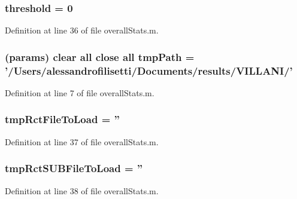 \hypertarget{a00026_a9ec673b91cb4ce5ba9842d584db1eea2}{
\subsubsection[{threshold}]{ threshold = 0}}\label{a00026_a9ec673b91cb4ce5ba9842d584db1eea2}


Definition at line 36 of file overall\-Stats.\-m.

\hypertarget{a00026_a1e5a4863ab2b87f923e1d19e2da1f5ac}{
\subsubsection[{tmp\-Path}]{(params) clear all close all tmp\-Path = '/Users/alessandrofilisetti/Documents/results/V\-I\-L\-L\-A\-N\-I/'}}\label{a00026_a1e5a4863ab2b87f923e1d19e2da1f5ac}


Definition at line 7 of file overall\-Stats.\-m.

\hypertarget{a00026_a729812cd35dceb80bddf2bea4d57c3d5}{
\subsubsection[{tmp\-Rct\-File\-To\-Load}]{ tmp\-Rct\-File\-To\-Load = ''}}\label{a00026_a729812cd35dceb80bddf2bea4d57c3d5}


Definition at line 37 of file overall\-Stats.\-m.

\hypertarget{a00026_aa7c848ee61f4363047d50b027f539e68}{
\subsubsection[{tmp\-Rct\-S\-U\-B\-File\-To\-Load}]{ tmp\-Rct\-S\-U\-B\-File\-To\-Load = ''}}\label{a00026_aa7c848ee61f4363047d50b027f539e68}


Definition at line 38 of file overall\-Stats.\-m.


